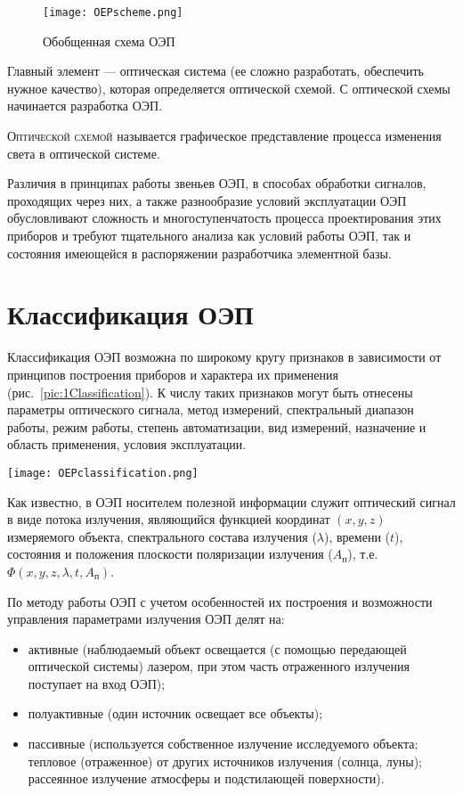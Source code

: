 \begin{figure}[h!]
	\begin{center}
		\texttt{[image: OEPscheme.png]}
		\caption{Обобщенная схема ОЭП}
		\label{pic:1OEPscheme}
	\end{center}
\end{figure}

Главный элемент --- оптическая система (ее сложно разработать, обеспечить нужное качество), которая определяется оптической схемой. С оптической схемы начинается разработка ОЭП.

\textsc{Оптической схемой} называется графическое представление процесса изменения света в оптической системе.

Различия в принципах работы звеньев ОЭП, в способах обработки сигналов, проходящих через них, а также разнообразие условий эксплуатации ОЭП обусловливают сложность и многоступенчатость процесса проектирования этих приборов и требуют тщательного анализа как условий работы ОЭП, так и состояния имеющейся в распоряжении разработчика элементной базы.

\section{Классификация ОЭП}

Классификация ОЭП возможна по широкому кругу признаков в зависимости от принципов построения приборов и характера их применения (рис.~\ref{pic:1Classification}). К числу таких признаков могут быть отнесены параметры оптического сигнала, метод измерений, спектральный диапазон работы, режим работы, степень автоматизации, вид измерений, назначение и область применения, условия эксплуатации.

\begin{figure*}[h]
	\texttt{[image: OEPclassification.png]}
	\caption{Классификация ОЭП}
	\label{pic:1Classification}
\end{figure*}

Как известно, в ОЭП носителем полезной информации служит оптический сигнал в виде потока излучения, являющийся функцией координат $(x, y, z)$ измеряемого объекта, спектрального состава излучения ($\lambda$), времени ($t$), состояния и положения плоскости поляризации излучения ($A_\text{п}$), т.е. $\Phi(x, y, z, \lambda, t, A_\text{п})$. 

По методу работы ОЭП с учетом особенностей их построения и возможности управления параметрами излучения ОЭП делят на:
\begin{itemize}
	\item активные (наблюдаемый объект освещается (с помощью передающей оптической системы) лазером, при этом часть отраженного излучения поступает на вход ОЭП);
	\item полуактивные (один источник освещает все объекты);
	\item пассивные (используется собственное излучение исследуемого объекта; тепловое  (отраженное) от других источников излучения (солнца, луны); рассеянное излучение атмосферы и подстилающей поверхности).
\end{itemize}

